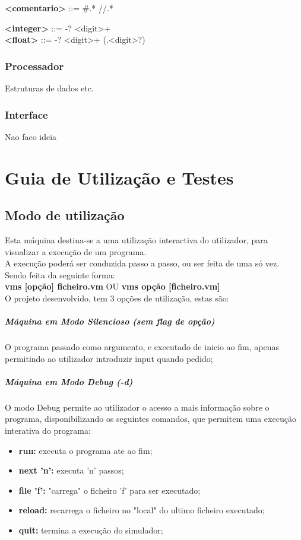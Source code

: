 \documentclass{report}
\begin{document}
\null\quad \textbf{\textless comentario\textgreater} ::= \#.* \textvertline \space //\textspace\space.*

\null\quad \textbf{\textless integer\textgreater} ::= -? \textless digit\textgreater + \\
\null\quad \textbf{\textless float\textgreater} ::= -? \textless digit\textgreater + (.\textless digit\textgreater *?)\\

\subsection{Processador}
\quad Estruturas de dados etc.
\subsection{Interface}
\quad Nao faco ideia

\chapter{Guia de Utilização e Testes}
\section{Modo de utilização}
\quad Esta máquina destina-se a uma utilização interactiva do utilizador, para visualizar a execução de um programa.\\
A execução poderá ser conduzida passo a passo, ou ser feita de uma só vez.\\
Sendo feita da seguinte forma:\\

\quad \textbf{vms [opção] ficheiro.vm} OU \textbf{vms opção [ficheiro.vm]}\\

O projeto desenvolvido, tem 3 opções de utilização, estas são:
\paragraph{\quad Máquina em Modo Silencioso (sem flag de opção)}
	O programa passado como argumento, e executado de inicio ao fim, apenas permitindo ao utilizador introduzir input quando pedido;
\paragraph{\quad Máquina em Modo Debug (-d)}
	O modo Debug permite ao utilizador o acesso a mais informação sobre o programa, disponibilizando
  os seguintes comandos, que permitem uma execução interativa do programa:
\begin{itemize}
	\item \textbf{run:} executa o programa ate ao fim;
	\item \textbf{next 'n':} executa 'n' passos;
	\item \textbf{file 'f':} "carrega" o ficheiro 'f' para ser executado;
	\item \textbf{reload:} recarrega o ficheiro no "local" do ultimo ficheiro executado;
	\item \textbf{quit:} termina a execução do simulador;
\end{itemize}
\end{document}
